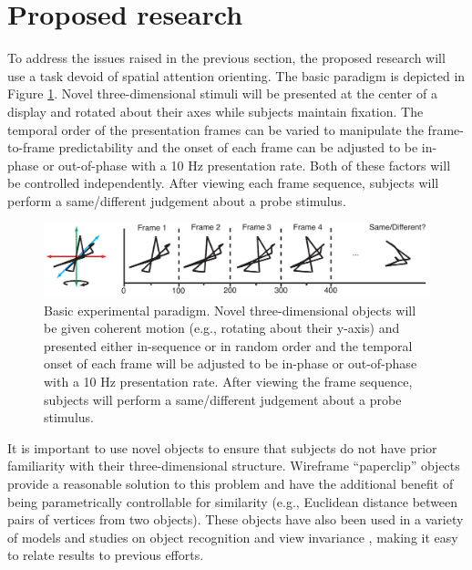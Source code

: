 \documentclass[12pt]{article}
\begin{document}
\section*{Proposed research}
To address the issues raised in the previous section, the proposed research will use a task devoid of spatial attention orienting. The basic paradigm is depicted in Figure \ref{fig:proposed_expt}. Novel three-dimensional stimuli will be presented at the center of a display and rotated about their axes while subjects maintain fixation. The temporal order of the presentation frames can be varied to manipulate the frame-to-frame predictability and the onset of each frame can be adjusted to be in-phase or out-of-phase with a 10 Hz presentation rate. Both of these factors will be controlled independently. After viewing each frame sequence, subjects will perform a same/different judgement about a probe stimulus.

\begin{figure}[h!]
\includegraphics[width=6.5in]{Paperclip.pdf}
\caption{\small{Basic experimental paradigm. Novel three-dimensional objects will be given coherent motion (e.g., rotating about their y-axis)} and presented either in-sequence or in random order and the temporal onset of each frame will be adjusted to be in-phase or out-of-phase with a 10 Hz presentation rate. After viewing the frame sequence, subjects will perform a same/different judgement about a probe stimulus.}
\label{fig:proposed_expt}
\end{figure}

It is important to use novel objects to ensure that subjects do not have prior familiarity with their three-dimensional structure. Wireframe ``paperclip'' objects provide a reasonable solution to this problem and have the additional benefit of being parametrically controllable for similarity (e.g., Euclidean distance between pairs of vertices from two objects). These objects have also been used in a variety of models and studies on object recognition and view invariance \cite[e.g.,]{PoggioEdelman90,BulthoffEdelman92,EdelmanBulthoff92,LogothetisPaulsBulthoffEtAl94,LogothetisPaulsPoggio95,RiesenhuberPoggio99,BalasSinha09b}, making it easy to relate results to previous efforts.
\end{document}
